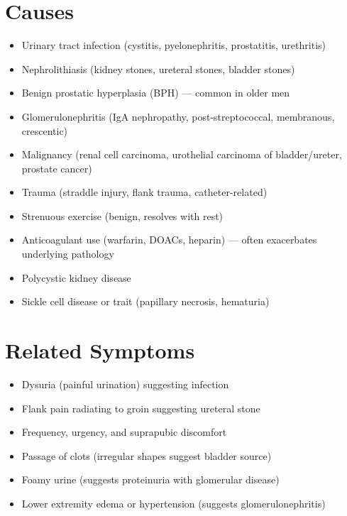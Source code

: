 \section*{Causes}
\begin{itemize}
  \item Urinary tract infection (cystitis, pyelonephritis, prostatitis, urethritis)
  \item Nephrolithiasis (kidney stones, ureteral stones, bladder stones)
  \item Benign prostatic hyperplasia (BPH) — common in older men
  \item Glomerulonephritis (IgA nephropathy, post-streptococcal, membranous, crescentic)
  \item Malignancy (renal cell carcinoma, urothelial carcinoma of bladder/ureter, prostate cancer)
  \item Trauma (straddle injury, flank trauma, catheter-related)
  \item Strenuous exercise (benign, resolves with rest)
  \item Anticoagulant use (warfarin, DOACs, heparin) — often exacerbates underlying pathology
  \item Polycystic kidney disease
  \item Sickle cell disease or trait (papillary necrosis, hematuria)
\end{itemize}

\section*{Related Symptoms}
\begin{itemize}
  \item Dysuria (painful urination) suggesting infection
  \item Flank pain radiating to groin suggesting ureteral stone
  \item Frequency, urgency, and suprapubic discomfort
  \item Passage of clots (irregular shapes suggest bladder source)
  \item Foamy urine (suggests proteinuria with glomerular disease)
  \item Lower extremity edema or hypertension (suggests glomerulonephritis)
\end{itemize}

